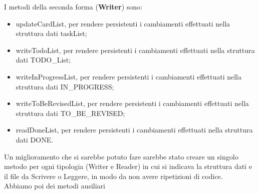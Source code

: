 \documentclass[]{article}
\begin{document}
I metodi della seconda forma (\textbf{Writer}) sono:
\begin{itemize}
	\item updateCardList, per rendere persistenti i cambiamenti effettuati nella struttura dati taskList;
	\item writeTodoList, per rendere persistenti i cambiamenti effettuati nella struttura dati TODO\_List;
	\item writeInProgressList, per rendere persistenti i cambiamenti effettuati nella struttura dati IN\_PROGRESS;
	\item writeToBeRevisedList, per rendere persistenti i cambiamenti effettuati nella struttura dati TO\_BE\_REVISED;
	\item readDoneList, per rendere persistenti i cambiamenti effettuati nella struttura dati DONE.
\end{itemize}
Un miglioramento che si sarebbe potuto fare sarebbe stato creare un singolo metodo per ogni tipologia (Writer e Reader) in cui si indicava la struttura dati e il file da Scrivere o Leggere, in modo da non avere ripetizioni di codice.\\
Abbiamo poi dei metodi ausiliari 
\end{document}
